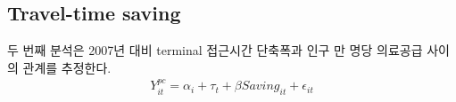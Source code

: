 \documentclass[a4paper, 10pt]{article}
\begin{document}
            \begin{table}[H]
                \centering
                \caption{Per-Capita Outcome, Travel Time: 상급종합병원}
                
            \end{table}

            \begin{table}[H]
                \centering
                \caption{Per-Capita Outcome, Travel Time: 의사}
                
            \end{table}

        \subsection{Travel-time saving}
            두 번째 분석은 2007년 대비 terminal 접근시간 단축폭과 인구 만 명당 의료공급
            사이의 관계를 추정한다.
            \begin{align*}
                Y^{pc}_{it}
                =
                \alpha_i + \tau_t
                + \beta Saving_{it}
                + \epsilon_{it}
            \end{align*}

            \begin{table}[H]
                \centering
                \caption{Per-Capita Outcome, Travel-Time Saving: 의원}
                
            \end{table}

            \begin{table}[H]
                \centering
                \caption{Per-Capita Outcome, Travel-Time Saving: 병원}
                
            \end{table}

            \begin{table}[H]
                \centering
                \caption{Per-Capita Outcome, Travel-Time Saving: 종합병원}
                
            \end{table}

            \begin{table}[H]
                \centering
                \caption{Per-Capita Outcome, Travel-Time Saving: 상급종합병원}
                
            \end{table}
\end{document}
